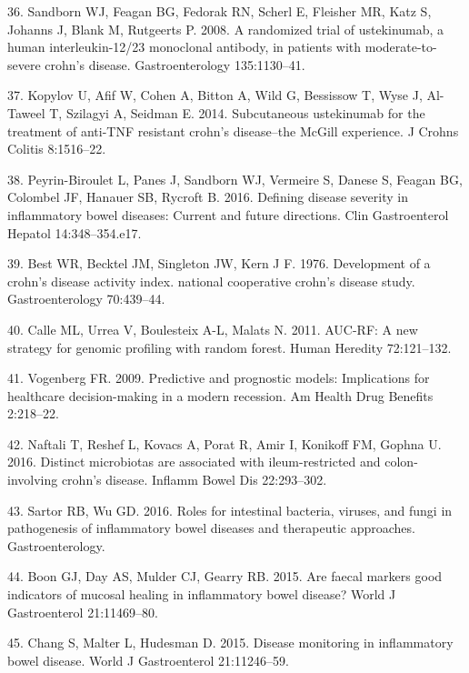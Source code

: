 \documentclass[12pt,]{article}
\begin{document}
\hypertarget{ref-sandborn_ust_2008}{}
36. Sandborn WJ, Feagan BG, Fedorak RN, Scherl E, Fleisher MR, Katz S,
Johanns J, Blank M, Rutgeerts P. 2008. A randomized trial of
ustekinumab, a human interleukin-12/23 monoclonal antibody, in patients
with moderate-to-severe crohn's disease. Gastroenterology 135:1130--41.

\hypertarget{ref-kopylov_ust_2014}{}
37. Kopylov U, Afif W, Cohen A, Bitton A, Wild G, Bessissow T, Wyse J,
Al-Taweel T, Szilagyi A, Seidman E. 2014. Subcutaneous ustekinumab for
the treatment of anti-TNF resistant crohn's disease--the McGill
experience. J Crohns Colitis 8:1516--22.

\hypertarget{ref-PB_CDAI_2016}{}
38. Peyrin-Biroulet L, Panes J, Sandborn WJ, Vermeire S, Danese S,
Feagan BG, Colombel JF, Hanauer SB, Rycroft B. 2016. Defining disease
severity in inflammatory bowel diseases: Current and future directions.
Clin Gastroenterol Hepatol 14:348--354.e17.

\hypertarget{ref-Best_CDAI_1976}{}
39. Best WR, Becktel JM, Singleton JW, Kern J F. 1976. Development of a
crohn's disease activity index. national cooperative crohn's disease
study. Gastroenterology 70:439--44.

\hypertarget{ref-calle_aucrf_2011}{}
40. Calle ML, Urrea V, Boulesteix A-L, Malats N. 2011. AUC-RF: A new
strategy for genomic profiling with random forest. Human Heredity
72:121--132.

\hypertarget{ref-Vogenberg_progmods_2009}{}
41. Vogenberg FR. 2009. Predictive and prognostic models: Implications
for healthcare decision-making in a modern recession. Am Health Drug
Benefits 2:218--22.

\hypertarget{ref-naftali_tissinvol_2016}{}
42. Naftali T, Reshef L, Kovacs A, Porat R, Amir I, Konikoff FM, Gophna
U. 2016. Distinct microbiotas are associated with ileum-restricted and
colon-involving crohn's disease. Inflamm Bowel Dis 22:293--302.

\hypertarget{ref-sartor_microbesIBD_2016}{}
43. Sartor RB, Wu GD. 2016. Roles for intestinal bacteria, viruses, and
fungi in pathogenesis of inflammatory bowel diseases and therapeutic
approaches. Gastroenterology.

\hypertarget{ref-boon_fmarkers_2015}{}
44. Boon GJ, Day AS, Mulder CJ, Gearry RB. 2015. Are faecal markers good
indicators of mucosal healing in inflammatory bowel disease? World J
Gastroenterol 21:11469--80.

\hypertarget{ref-chang_monitoring_2015}{}
45. Chang S, Malter L, Hudesman D. 2015. Disease monitoring in
inflammatory bowel disease. World J Gastroenterol 21:11246--59.
\end{document}
